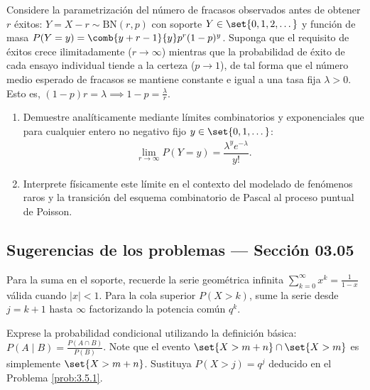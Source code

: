 \begin{problema}
	\label{prob:3.5.10}
	Considere la parametrización del número de fracasos observados antes de obtener $r$ éxitos: $Y = X - r \sim \text{BN}(r, p)$ con soporte $Y \in \set{0, 1, 2, \dots}$ y función de masa $P(Y = y) = \comb{y+r-1}{y} p^r (1-p)^y$. Suponga que el requisito de éxitos crece ilimitadamente ($r \to \infty$) mientras que la probabilidad de éxito de cada ensayo individual tiende a la certeza ($p \to 1$), de tal forma que el número medio esperado de fracasos se mantiene constante e igual a una tasa fija $\lambda > 0$. Esto es, $(1-p)r = \lambda \implies 1-p = \frac{\lambda}{r}$.
	\begin{enumerate}
		\item Demuestre analíticamente mediante límites combinatorios y exponenciales que para cualquier entero no negativo fijo $y \in \set{0, 1, \dots}$:
		\begin{align*}
			\lim_{r \to \infty} P(Y = y) = \dfrac{\lambda^y e^{-\lambda}}{y!}.
		\end{align*}
		\item Interprete físicamente este límite en el contexto del modelado de fenómenos raros y la transición del esquema combinatorio de Pascal al proceso puntual de Poisson.
	\end{enumerate}
\end{problema}


\subsection*{Sugerencias de los problemas --- Sección 03.05}

\begin{sugerencia}
	\label{sug:3.5.1}
	Para la suma en el soporte, recuerde la serie geométrica infinita $\sum_{k=0}^{\infty} x^k = \frac{1}{1-x}$ válida cuando $|x| < 1$. Para la cola superior $P(X > k)$, sume la serie desde $j = k+1$ hasta $\infty$ factorizando la potencia común $q^k$.
\end{sugerencia}

\begin{sugerencia}
	\label{sug:3.5.2}
	Exprese la probabilidad condicional utilizando la definición básica: $P(A \mid B) = \frac{P(A \cap B)}{P(B)}$. Note que el evento $\set{X > m+n} \cap \set{X > m}$ es simplemente $\set{X > m+n}$. Sustituya $P(X > j) = q^j$ deducido en el Problema \ref{prob:3.5.1}.
\end{sugerencia}


